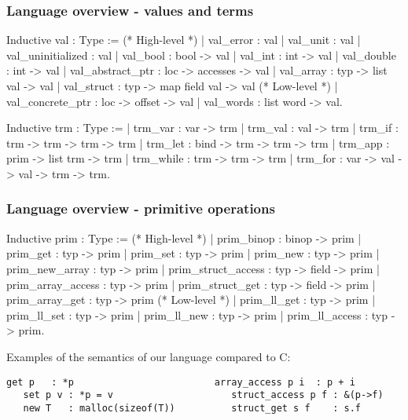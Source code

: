 \begin{frame}[fragile]
\frametitle{Language overview - values and terms}

\begin{coqs}
Inductive val : Type :=
  (* High-level *)
  | val_error : val
  | val_unit : val
  | val_uninitialized : val
  | val_bool : bool -> val
  | val_int : int -> val
  | val_double : int -> val
  | val_abstract_ptr : loc -> accesses -> val
  | val_array : typ -> list val -> val
  | val_struct : typ -> map field val -> val
  (* Low-level *)
  | val_concrete_ptr : loc -> offset -> val
  | val_words : list word -> val.
\end{coqs}

\begin{coqs}
Inductive trm : Type :=
  | trm_var : var -> trm
  | trm_val : val -> trm
  | trm_if : trm -> trm -> trm -> trm
  | trm_let : bind -> trm -> trm -> trm
  | trm_app : prim -> list trm -> trm
  | trm_while : trm -> trm -> trm
  | trm_for : var -> val -> val -> trm -> trm.
\end{coqs}

\end{frame}


\begin{frame}[fragile]
\frametitle{Language overview - primitive operations}

\begin{coqs}
Inductive prim : Type :=
  (* High-level *)
  | prim_binop : binop -> prim
  | prim_get : typ -> prim
  | prim_set : typ -> prim
  | prim_new : typ -> prim
  | prim_new_array : typ -> prim
  | prim_struct_access : typ -> field -> prim
  | prim_array_access : typ -> prim
  | prim_struct_get : typ -> field -> prim
  | prim_array_get : typ -> prim
  (* Low-level *)
  | prim_ll_get : typ -> prim
  | prim_ll_set : typ -> prim
  | prim_ll_new : typ -> prim
  | prim_ll_access : typ -> prim.
\end{coqs}

Examples of the semantics of our language compared to C:

\begin{Verbatim}[fontsize=\scriptsize]
   get p   : *p                         array_access p i  : p + i
   set p v : *p = v                     struct_access p f : &(p->f)
   new T   : malloc(sizeof(T))          struct_get s f    : s.f
\end{Verbatim}

\end{frame}



